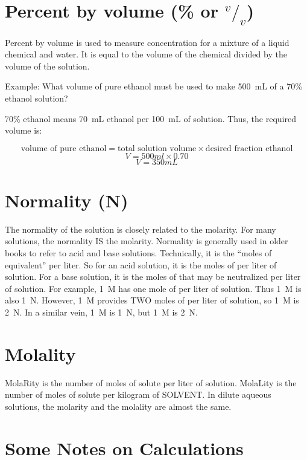 \section{Percent by volume \texorpdfstring{(\% or $^v/_v$)}{}}

Percent by volume is used to measure concentration for a mixture of a liquid chemical and water. It is equal to the volume of the chemical divided by the volume of the solution.

Example: What volume of pure ethanol must be used to make 500~mL of a 70\% ethanol solution?

70\% ethanol means 70~mL ethanol per 100~mL of solution. Thus, the required volume is:

\[ \mathrm{\text{volume of pure ethanol}} = \mathrm{\text{total solution volume}} \times \mathrm{\text{desired fraction ethanol}} \]
\[ V = 500ml \times 0.70 \]
\[ V = 350 mL \] 

\section{Normality (N)}

The normality of the solution is closely related to the molarity. For many solutions, the normality IS the molarity. Normality is generally used in older books to refer to acid and base solutions. Technically, it is the ``moles of equivalent'' per liter. So for an acid solution, it is the moles of  per liter of solution. For a base solution, it is the moles of  that may be neutralized per liter of solution. For example, 1~M  has one mole of  per liter of solution. Thus 1~M  is also 1~N. However, 1~M  provides TWO moles of  per liter of solution, so 1~M  is 2~N. In a similar vein, 1~M  is 1~N, but 1~M  is 2~N.

\section{Molality}

MolaRity is the number of moles of solute per liter of solution. MolaLity is the number of moles of solute per kilogram of SOLVENT. In dilute aqueous solutions, the molarity and the molality are almost the same.

\section{Some Notes on Calculations}

